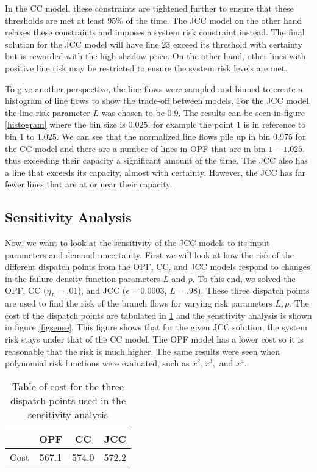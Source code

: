 In the CC model, these constraints are tightened further to ensure that these thresholds are met at least 95\% of the time.  The JCC model on the other hand relaxes these constraints and imposes a system risk constraint instead.  The final solution for the JCC model will have line 23 exceed its threshold with certainty but is rewarded with the high shadow price.  On the other hand, other lines with positive line risk may be restricted to ensure the system risk levels are met.

To give another perspective, the line flows were sampled and binned to create a histogram of line flows to show the trade-off between models.  For the JCC model, the line risk parameter $L$ was chosen to be 0.9.  The results can be seen in figure \ref{histogram} where the bin size is $0.025$, for example the point $1$ is in reference to bin $1$ to $1.025$.  We can see that the normalized line flows pile up in bin 0.975 for the CC model and there are a number of lines in OPF that are in bin $1-1.025$, thus exceeding their capacity a significant amount of the time.  The JCC also has a line that exceeds its capacity, almost with certainty.  However, the JCC has far fewer lines that are at or near their capacity.



\subsection{Sensitivity Analysis}\label{senseanal}
Now, we want to look at the sensitivity of the JCC models to its input parameters and demand uncertainty.  First we will look at how the risk of the different dispatch points from the OPF, CC, and JCC models respond to changes in the failure density function parameters $L$ and $p$.  To this end, we solved the OPF, CC ($\eta_L=.01$), and JCC ($\epsilon=0.0003$, $L=.98$).  These three dispatch points are used to find the risk of the branch flows for varying risk parameters $L,p$. The cost of the dispatch points are tabulated in \ref{tabsense} and the sensitivity analysis is shown in figure \ref{figsense}. This figure shows that for the given JCC solution, the system risk stays under that of the CC model.  The OPF model has a lower cost so it is reasonable that the risk is much higher.  The same results were seen when polynomial risk functions were evaluated, such as $x^2,x^3,$ and $x^4$.


\begin{table}
\centering
 \begin{tabular}{ |c| c c c |}
\hline
& OPF & CC & JCC \\
\hline
\hline
Cost & 567.1 & 574.0 & 572.2\\
\hline
\end{tabular}
\caption{Table of cost for the three dispatch points used in the sensitivity analysis}\label{tabsense}
\end{table}


